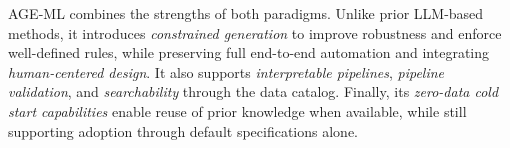 \documentclass[runningheads]{llncs}
\newcommand{\ourapproach}[0]{\textsc{AGE-ML}}
\begin{document}
\ourapproach{} combines the strengths of both paradigms.
%
Unlike prior \ac{LLM}-based methods,
it introduces \emph{constrained generation} to improve robustness and enforce well-defined rules,
while preserving full end-to-end automation and integrating \emph{human-centered design}.
%
It also supports \emph{interpretable pipelines},
\emph{pipeline validation},
and \emph{searchability} through the data catalog.
%
Finally, its \emph{zero-data cold start capabilities} enable reuse of prior knowledge when available,
while still supporting adoption through default specifications alone.



\end{document}
